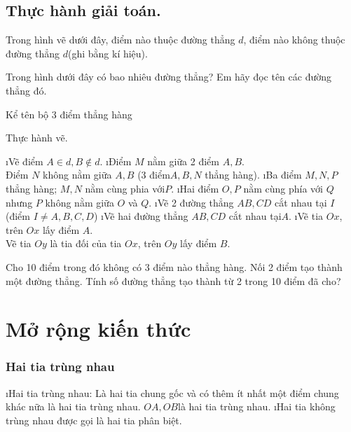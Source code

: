 \subsection{Thực hành giải toán.}
\begin{vd}
	Trong hình vẽ dưới đây, điểm nào thuộc đường thẳng $d$, điểm nào không thuộc đường thẳng $d$(ghi bằng kí hiệu).
\end{vd}
\begin{vd}
	Trong hình dưới đây có bao nhiêu đường thẳng? Em hãy đọc tên các đường thẳng đó.
\end{vd}
\begin{vd}
	Kể tên bộ 3 điểm thẳng hàng                         
\end{vd}
\begin{vd}
	Thực hành vẽ.
	\begin{enumerate}[a),leftmargin=*]
		\i Vẽ điểm $A\in d,B\notin d.$
		\i Điểm $M$ nằm giữa 2 điểm $A,B$.\\
		Điểm $N$ không nằm giữa $A,B$ (3 điểm$ A,B,N$ thẳng hàng).
		\i Ba điểm $M,N,P$ thẳng hàng; $M,N$ nằm cùng phia với$P$.
		\i Hai điểm $O,P$ nằm cùng phía với $Q$ nhưng $P$ không nằm giữa $O$ và $Q$.
		\i Vẽ 2 đường thẳng $AB,CD$ cắt nhau tại $I $(điểm $I\ne A,B,C,D$)
		\i Vẽ hai đường thẳng $AB,CD$ cắt nhau tại$A$.
		\i Vẽ tia $Ox$, trên $Ox$ lấy điểm $A$.\\
		Vẽ tia $Oy$ là tia đối của tia $Ox$, trên $Oy$ lấy điểm $B$. 
	\end{enumerate}   
\end{vd}
\begin{vd}
	Cho 10 điểm trong đó không có 3 điểm nào thẳng hàng. Nối 2 điểm tạo thành một đường thẳng. Tính số đường thẳng tạo thành từ 2 trong 10 điểm đã cho?
\end{vd}
\section{Mở rộng kiến thức}
\subsubsection{Hai tia trùng nhau}
\begin{enumerate}[--,leftmargin=*]
\i Hai tia trùng nhau: Là hai tia chung gốc và có thêm ít nhất một điểm chung khác nữa là hai tia trùng nhau.	
%		
$OA,OB$là hai tia trùng nhau.
\i Hai tia không trùng nhau được gọi là hai tia phân biệt.
\end{enumerate}
